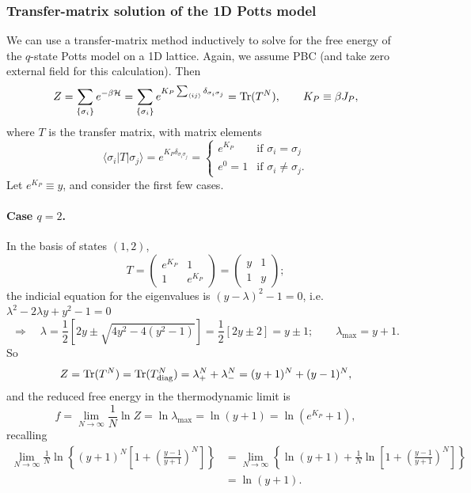 \subsubsection*{Transfer-matrix solution of the 1D Potts model}

We can use a transfer-matrix method inductively to solve for the free energy of the $q$-state Potts model on a 1D lattice.
Again, we assume PBC (and take zero external field for this calculation). Then
\begin{equation}
  Z = \sum_{\{\sigma_i\}}e^{-\beta\mathcal{H}} = \sum_{\{\sigma_i\}}e^{K_P\sum_{\langle ij\rangle}\delta_{\sigma_i\sigma_j}} = \operatorname{Tr}(T^N),
  \qquad K_P\equiv\beta J_P,
\end{equation}
where $T$ is the transfer matrix, with matrix elements
\begin{equation}
  \langle\sigma_i|T|\sigma_j\rangle = e^{K_P\delta_{\sigma_i\sigma_j}}
  = \begin{cases} e^{K_P} & \text{if } \sigma_i = \sigma_j\\ e^0 = 1 & \text{if } \sigma_i\ne\sigma_j .\end{cases}
\end{equation}
Let $e^{K_P}\equiv y$, and consider the first few cases.

\paragraph{Case $q = 2$.} In the basis of states $(1,2)$,
\begin{equation}
  T = \begin{pmatrix} e^{K_P} & 1\\ 1 & e^{K_P}\end{pmatrix} = \begin{pmatrix} y & 1\\ 1 & y\end{pmatrix};
\end{equation}
the indicial equation for the eigenvalues is $(y-\lambda)^2-1 = 0$, i.e.\ $\lambda^2-2\lambda y+y^2-1 = 0$
\begin{equation}
  \Rightarrow\quad\lambda = \frac{1}{2}\left[2y\pm\sqrt{4y^2-4(y^2-1)}\right] = \frac{1}{2}\left[2y\pm 2\right] = y\pm 1;
  \qquad\lambda_{\max} = y+1 .
\end{equation}
So
\begin{equation}
  Z = \operatorname{Tr}(T^N) = \operatorname{Tr}(T_{\text{diag}}^N) = \lambda_+^N + \lambda_-^N = (y+1)^N + (y-1)^N,
\end{equation}
and the reduced free energy in the thermodynamic limit is
\begin{equation}
  f = \lim_{N\to\infty}\frac{1}{N}\ln Z = \ln\lambda_{\max} = \ln(y+1) = \ln\left(e^{K_P}+1\right),
\end{equation}
recalling
\begin{align}
  \lim_{N\to\infty}\frac{1}{N}\ln\left\{(y+1)^N\left[1+\left(\frac{y-1}{y+1}\right)^N\right]\right\}
  &= \lim_{N\to\infty}\left\{\ln(y+1) + \frac{1}{N}\ln\left[1+\left(\frac{y-1}{y+1}\right)^N\right]\right\}\nonumber\\
  &= \ln(y+1).
\end{align}

